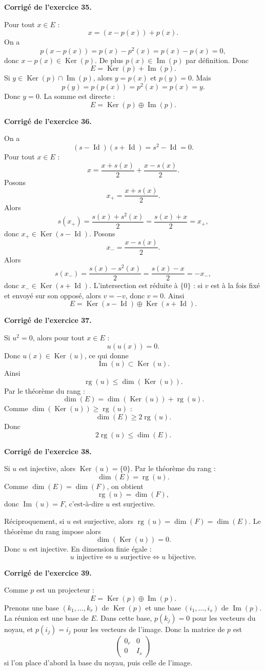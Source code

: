 \documentclass[11pt,a4paper]{article}
\newcommand{\corr}[1]{
    \vspace{0.4cm}
    \noindent\textbf{\textcolor{blue!60!black}{Corrigé de l'exercice #1.}}
    \par\vspace{0.1cm}
}
\newcommand{\Ker}{\operatorname{Ker}}
\newcommand{\Img}{\operatorname{Im}}
\newcommand{\rg}{\operatorname{rg}}
\newcommand{\Id}{\operatorname{Id}}
\begin{document}
\corr{35}
Pour tout $x\in E$ :
\[
x=(x-p(x))+p(x).
\]
On a
\[
p(x-p(x))=p(x)-p^2(x)=p(x)-p(x)=0,
\]
donc $x-p(x)\in\Ker(p)$. De plus $p(x)\in\Img(p)$ par définition. Donc
\[
E=\Ker(p)+\Img(p).
\]
Si $y\in\Ker(p)\cap\Img(p)$, alors $y=p(x)$ et $p(y)=0$. Mais
\[
p(y)=p(p(x))=p^2(x)=p(x)=y.
\]
Donc $y=0$. La somme est directe :
\[
E=\Ker(p)\oplus\Img(p).
\]

\corr{36}
On a
\[
(s-\Id)(s+\Id)=s^2-\Id=0.
\]
Pour tout $x\in E$ :
\[
x=\frac{x+s(x)}{2}+\frac{x-s(x)}{2}.
\]
Posons
\[
x_+=\frac{x+s(x)}2.
\]
Alors
\[
s(x_+)=\frac{s(x)+s^2(x)}2=\frac{s(x)+x}{2}=x_+,
\]
donc $x_+\in\Ker(s-\Id)$.
Posons
\[
x_-=\frac{x-s(x)}2.
\]
Alors
\[
s(x_-)=\frac{s(x)-s^2(x)}2=\frac{s(x)-x}{2}=-x_-,
\]
donc $x_-\in\Ker(s+\Id)$.
L'intersection est réduite à $\{0\}$ : si $v$ est à la fois fixé et envoyé sur son opposé, alors $v=-v$, donc $v=0$. Ainsi
\[
E=\Ker(s-\Id)\oplus\Ker(s+\Id).
\]

\corr{37}
Si $u^2=0$, alors pour tout $x\in E$ :
\[
u(u(x))=0.
\]
Donc $u(x)\in\Ker(u)$, ce qui donne
\[
\Img(u)\subset\Ker(u).
\]
Ainsi
\[
\rg(u)\leq \dim(\Ker(u)).
\]
Par le théorème du rang :
\[
\dim(E)=\dim(\Ker(u))+\rg(u).
\]
Comme $\dim(\Ker(u))\geq \rg(u)$ :
\[
\dim(E)\geq 2\rg(u).
\]
Donc
\[
2\rg(u)\leq \dim(E).
\]

\corr{38}
Si $u$ est injective, alors $\Ker(u)=\{0\}$. Par le théorème du rang :
\[
\dim(E)=\rg(u).
\]
Comme $\dim(E)=\dim(F)$, on obtient
\[
\rg(u)=\dim(F),
\]
donc $\Img(u)=F$, c'est-à-dire $u$ est surjective.

Réciproquement, si $u$ est surjective, alors $\rg(u)=\dim(F)=\dim(E)$. Le théorème du rang impose alors
\[
\dim(\Ker(u))=0.
\]
Donc $u$ est injective. En dimension finie égale :
\[
u\text{ injective}\Longleftrightarrow u\text{ surjective}\Longleftrightarrow u\text{ bijective}.
\]

\corr{39}
Comme $p$ est un projecteur :
\[
E=\Ker(p)\oplus\Img(p).
\]
Prenons une base $(k_1,\dots,k_r)$ de $\Ker(p)$ et une base $(i_1,\dots,i_s)$ de $\Img(p)$. La réunion est une base de $E$.
Dans cette base, $p(k_j)=0$ pour les vecteurs du noyau, et $p(i_j)=i_j$ pour les vecteurs de l'image. Donc la matrice de $p$ est
\[
\begin{pmatrix}
0_r&0\\
0&I_s
\end{pmatrix}
\]
si l'on place d'abord la base du noyau, puis celle de l'image.
\end{document}
